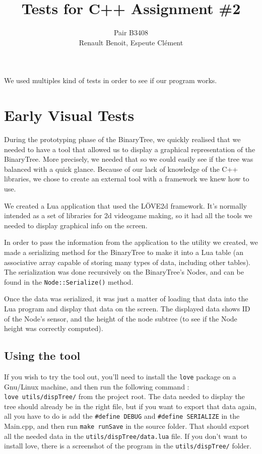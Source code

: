 \documentclass[10pt]{article}
\title{Tests for C++ Assignment \#2}
\author{Pair B3408 \\ {\sc Renault} Benoit, {\sc Espeute} Clément}
\date{}
\begin{document}
\pagestyle{fancy}
\maketitle
We used multiples kind of tests in order to see if our program works.


\section{Early Visual Tests}
During the prototyping phase of the BinaryTree, we quickly realised that we needed to have a tool that allowed us to display a graphical representation of the BinaryTree. More precisely, we needed that so we could easily see if the tree was balanced with a quick glance. Because of our lack of knowledge of the C++ libraries, we chose to create an external tool with a framework we knew how to use.

We created a Lua application that used the LÖVE2d framework. It's normally intended as a set of libraries for 2d videogame making, so it had all the tools we needed to display graphical info on the screen.

In order to pass the information from the application to the utility we created, we made a serializing method for the BinaryTree to make it into a Lua table (an associative array capable of storing many types of data, including other tables). The serialization was done recursively on the BinaryTree's Nodes, and can be found in the \texttt{Node::Serialize()} method.

Once the data was serialized, it was just a matter of loading that data into the Lua program and display that data on the screen. The displayed data shows ID of the Node's sensor, and the height of the node subtree (to see if the Node height was correctly computed).

\subsection*{Using the tool}
If you wish to try the tool out, you'll need to install the \texttt{love} package on a Gnu/Linux machine, and then run the following command : \texttt{love~utils/dispTree/} from the project root. The data needed to display the tree should already be in the right file, but if you want to export that data again, all you have to do is add the {\tt \#define DEBUG} and {\tt \#define SERIALIZE} in the Main.cpp, and then run \texttt{make runSave} in the source folder. That should export all the needed data in the \texttt{utils/dispTree/data.lua} file. If you don't want to install love, there is a screenshot of the program in the \texttt{utils/dispTree/} folder.
\end{document}
